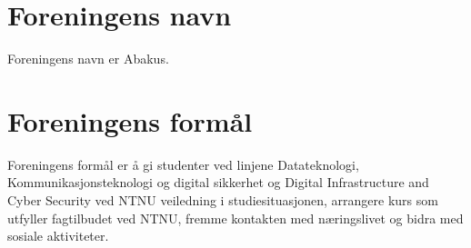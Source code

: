 \section{Foreningens navn}
Foreningens navn er Abakus.

\section{Foreningens formål}\label{sec:foreningens_formaal}
Foreningens formål er å gi studenter ved linjene Datateknologi, Kommunikasjonsteknologi og digital sikkerhet 
og Digital Infrastructure and Cyber Security ved NTNU veiledning i studiesituasjonen, arrangere kurs som utfyller
 fagtilbudet ved NTNU, fremme kontakten med næringslivet og bidra med sosiale aktiviteter.

